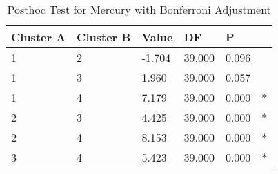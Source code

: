 \begin{table}[h]
\caption{Posthoc Test for Mercury with Bonferroni Adjustment}
\label{tab:posthoc_Mercury}
\begin{tabular}{llllll}
\toprule
Cluster A & Cluster B & Value & DF & P &   \\
\midrule
1 & 2 & -1.704 & 39.000 & 0.096 &   \\
1 & 3 & 1.960 & 39.000 & 0.057 &   \\
1 & 4 & 7.179 & 39.000 & 0.000 & * \\
2 & 3 & 4.425 & 39.000 & 0.000 & * \\
2 & 4 & 8.153 & 39.000 & 0.000 & * \\
3 & 4 & 5.423 & 39.000 & 0.000 & * \\
\bottomrule
\end{tabular}
\end{table}
